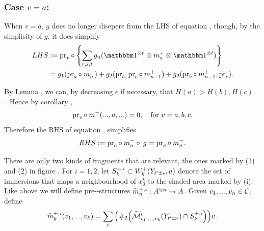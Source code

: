 \subsubsection{Case $v = a$:}
When $v = a$, $g$ does no longer disepere from the LHS of equation
, though, by the simplisity of $g$, it does simplify
%
\begin{align*}
LHS &:= \pr_v \circ\: \qty{ \sum_{r,s,t} g_u(\I^{\otimes r} \otimes m^+_s
\otimes \I^{\otimes t}) } \\
&= g_1 (\pr_a \circ\: m^+_n) + g_2(\pr_b, \pr_c \circ\: m^+_{n-1})
+ g_2(\pr_b \circ\: m^+_{n-1}, \pr_c).
\end{align*}

By Lemma , we can, by decreasing $\epsilon$ if necessary,
that $H(a) > H(b), H(c)$. Hence by corollary
, 
\[ \operatorname{pr}_v \circ\: m^+(...,a,...) = 0, \quad\text{for } v = a,b,c. \]
Therefore the RHS of equation , simplifies
\[ RHS := \operatorname{pr}_a \circ\: m^-_n \circ\: g = \operatorname{pr}_a \circ\: m^-_n. \]

There are only two kinds of fragments that are relevant, the ones marked
by (1) and (2) in figure . For $i=1,2$, let $S^{\pm,i}_k
\subset W^+_k(Y_{t'\pm\epsilon}, a)$ denote the set of immersions that maps a
neighbourhood of $x^k_0$ to the shaded area marked by (i). Like above we will
define pre-\Ainf-structures $\widetilde{m}^{\pm, i}_n : A^{\otimes n} \to A$. 
Given $v_1,...,v_n \in \mathcal{C}$, define 
%
\begin{equation}
\widetilde{m}^{\pm, i}_k(v_1, ..., v_k) = \sum_v \qty(\#_2\qty(
\widetilde{\mathcal{M}}^v_{v_1,...,v_k}(Y_{t'\pm\epsilon}) \cap S^{\pm, i}_k))  v.
\end{equation}
